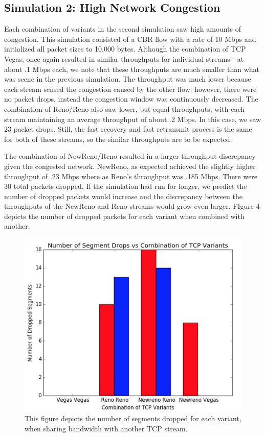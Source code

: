 \subsection{Simulation 2: High Network Congestion}

Each combination of variants in the second simulation saw high amounts of congestion. This simulation consisted of a CBR flow with a rate of 10 Mbps and initialized all packet sizes to 10,000 bytes. Although the combination of TCP Vegas, once again resulted in similar throughputs for individual streams - at about .1 Mbps each, we note that these throughputs are much smaller than what was scene in the previous simulation. The throughput was much lower because each stream sensed the congestion caused by the other flow; however, there were no packet drops, instead the congestion window was continuously decreased. The combination of Reno/Reno also saw lower, but equal throughputs, with each stream maintaining an average throughput of about .2 Mbps. In this case, we saw 23 packet drops. Still, the fast recovery and fast retransmit process is the same for both of these streams, so the similar throughputs are to be expected.

The combination of NewReno/Reno resulted in a larger throughput discrepancy given the congested network. NewReno, as expected achieved the slightly higher throughput of .23 Mbps where as Reno's throughput was .185 Mbps. There were 30 total packets dropped. If the simulation had run for longer, we predict the number of dropped packets would increase and the discrepancy between the throughputs of the NewReno and Reno streams would grow even larger. FIgure 4 depicts the number of dropped packets for each variant when combined with another.

\begin{figure}[!htbp]
	\includegraphics[scale=0.3]{exp2_dp.png}
	\caption{This figure depicts the number of segments dropped for each variant, when sharing bandwidth with another TCP stream.}
	\label{a:label}
\end{figure}


